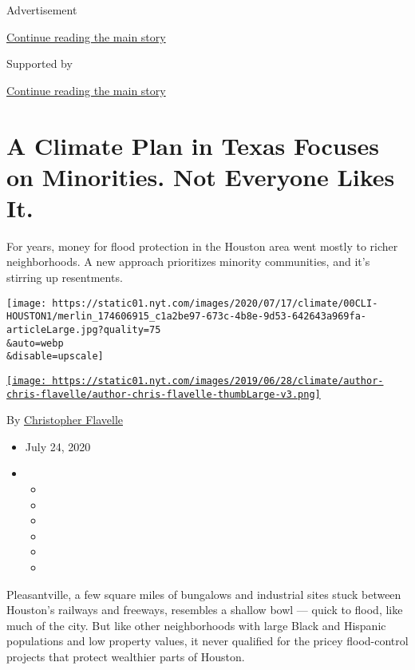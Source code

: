 Advertisement

\protect\hyperlink{after-top}{Continue reading the main story}

Supported by

\protect\hyperlink{after-sponsor}{Continue reading the main story}

\hypertarget{a-climate-plan-in-texas-focuses-on-minorities-not-everyone-likes-it}{%
\section{A Climate Plan in Texas Focuses on Minorities. Not Everyone
Likes
It.}\label{a-climate-plan-in-texas-focuses-on-minorities-not-everyone-likes-it}}

For years, money for flood protection in the Houston area went mostly to
richer neighborhoods. A new approach prioritizes minority communities,
and it's stirring up resentments.

\texttt{[image: https://static01.nyt.com/images/2020/07/17/climate/00CLI-HOUSTON1/merlin\_174606915\_c1a2be97-673c-4b8e-9d53-642643a969fa-articleLarge.jpg?quality=75\\\&auto=webp\\\&disable=upscale]}

\href{https://www.nytimes.com/by/christopher-flavelle}{\texttt{[image: https://static01.nyt.com/images/2019/06/28/climate/author-chris-flavelle/author-chris-flavelle-thumbLarge-v3.png]}}

By \href{https://www.nytimes.com/by/christopher-flavelle}{Christopher
Flavelle}

\begin{itemize}
\item
  July 24, 2020
\item
  \begin{itemize}
  \item
  \item
  \item
  \item
  \item
  \item
  \end{itemize}
\end{itemize}

Pleasantville, a few square miles of bungalows and industrial sites
stuck between Houston's railways and freeways, resembles a shallow bowl
--- quick to flood, like much of the city. But like other neighborhoods
with large Black and Hispanic populations and low property values, it
never qualified for the pricey flood-control projects that protect
wealthier parts of Houston.

